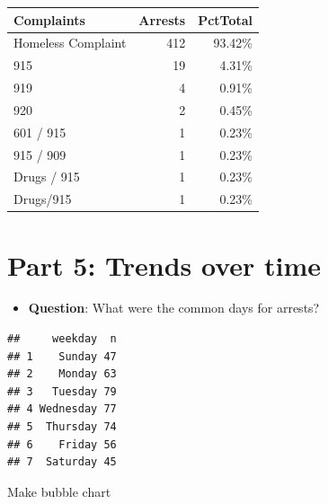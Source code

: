 \documentclass[]{book}
\newenvironment{Shaded}{\begin{snugshade}}{\end{snugshade}}
\newcommand{\KeywordTok}[1]{\textcolor[rgb]{0.13,0.29,0.53}{\textbf{#1}}}
\newcommand{\NormalTok}[1]{#1}
\newcommand{\OperatorTok}[1]{\textcolor[rgb]{0.81,0.36,0.00}{\textbf{#1}}}
\newcommand{\StringTok}[1]{\textcolor[rgb]{0.31,0.60,0.02}{#1}}
\providecommand{\tightlist}{%
  \setlength{\itemsep}{0pt}\setlength{\parskip}{0pt}}
\begin{document}
\begin{table}
\centering
\begin{tabular}{l|r|r}
\hline
Complaints & Arrests & PctTotal\\
\hline
Homeless Complaint & 412 & 93.42\%\\
\hline
915 & 19 & 4.31\%\\
\hline
919 & 4 & 0.91\%\\
\hline
920 & 2 & 0.45\%\\
\hline
601 / 915 & 1 & 0.23\%\\
\hline
915 / 909 & 1 & 0.23\%\\
\hline
Drugs / 915 & 1 & 0.23\%\\
\hline
Drugs/915 & 1 & 0.23\%\\
\hline
\end{tabular}
\end{table}

\hypertarget{part-5-trends-over-time}{%
\chapter{Part 5: Trends over time}\label{part-5-trends-over-time}}

\begin{itemize}
\tightlist
\item
  \textbf{Question}: What were the common days for arrests?
\end{itemize}

\begin{Shaded}
\end{Shaded}

\begin{verbatim}
##     weekday  n
## 1    Sunday 47
## 2    Monday 63
## 3   Tuesday 79
## 4 Wednesday 77
## 5  Thursday 74
## 6    Friday 56
## 7  Saturday 45
\end{verbatim}

Make bubble chart
\end{document}
